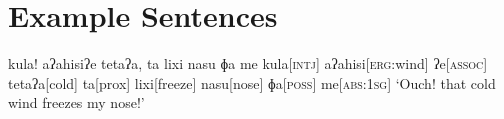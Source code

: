 \part{Example Sentences}








\ex
\begingl
\glpreamble kula! aʔahisiʔe tetaʔa, ta lixi nasu ɸa me\endpreamble
kula[\textsc{intj}]
aʔahisi[\textsc{erg:}wind]
ʔe[\textsc{assoc}]
tetaʔa[cold]
ta[prox]
lixi[freeze]
nasu[nose]
ɸa[\textsc{poss}]
me[\textsc{abs:1sg}]
\glft `Ouch! that cold wind freezes my nose!'
\endgl
\xe

